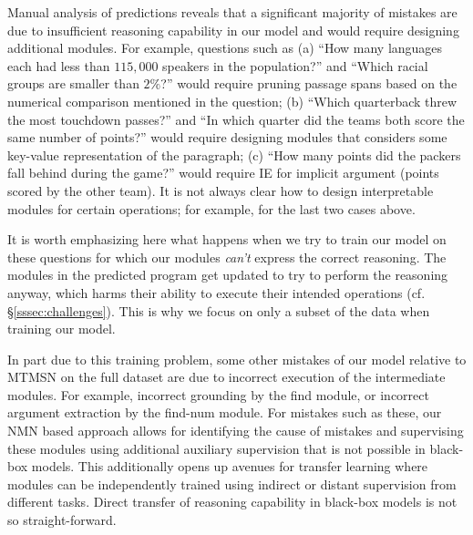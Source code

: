 \documentclass[main.tex]{subfiles}
\begin{document}
Manual analysis of predictions reveals that a significant majority of mistakes are due to insufficient reasoning capability in our model and would require designing additional modules. For example, questions such as (a) “How many languages each had less than $115,000$ speakers in the population?” and “Which racial groups are smaller than $2\%$?” would require pruning passage spans based on the numerical comparison mentioned in the question; (b) “Which quarterback threw the most touchdown passes?” and “In which quarter did the teams both score the same number of points?” would require designing modules that considers some key-value representation of the paragraph; (c) “How many points did the packers fall behind during the game?” would require IE for implicit argument (points scored by the other team).
It is not always clear how to design interpretable modules for certain operations; for example, for the last two cases above.

It is worth emphasizing here what happens when we try to train our model on these questions for which our modules \emph{can't} express the correct reasoning.  The modules in the predicted program get updated to try to perform the reasoning anyway, which harms their ability to execute their intended operations (cf. \S\ref{sssec:challenges}).  This is why we focus on only a subset of the data when training our model.

In part due to this training problem, some other mistakes of our model relative to MTMSN on the full dataset are due to incorrect execution of the intermediate modules. For example, incorrect grounding by the find module, or incorrect argument extraction by the find-num module. For mistakes such as these, our NMN based approach allows for identifying the cause of mistakes and supervising these modules using additional auxiliary supervision that is not possible in black-box models.
This additionally opens up avenues for transfer learning where modules can be independently trained using indirect or distant supervision from different tasks. Direct transfer of reasoning capability in black-box models is not so straight-forward.
\end{document}

